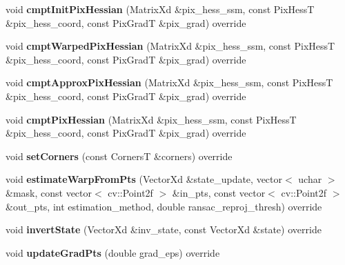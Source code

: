\begin{DoxyCompactItemize}
\item 
\hypertarget{classTPS_a16d1b72bf97b423d5d760c1ec2b727d3}{void {\bfseries cmpt\-Init\-Pix\-Hessian} (Matrix\-Xd \&pix\-\_\-hess\-\_\-ssm, const Pix\-Hess\-T \&pix\-\_\-hess\-\_\-coord, const Pix\-Grad\-T \&pix\-\_\-grad) override}\label{classTPS_a16d1b72bf97b423d5d760c1ec2b727d3}

\item 
\hypertarget{classTPS_ac5d977af551d1eb7a14006811ced666a}{void {\bfseries cmpt\-Warped\-Pix\-Hessian} (Matrix\-Xd \&pix\-\_\-hess\-\_\-ssm, const Pix\-Hess\-T \&pix\-\_\-hess\-\_\-coord, const Pix\-Grad\-T \&pix\-\_\-grad) override}\label{classTPS_ac5d977af551d1eb7a14006811ced666a}

\item 
\hypertarget{classTPS_ad5c53e500b568cedc1ebc722df1bac32}{void {\bfseries cmpt\-Approx\-Pix\-Hessian} (Matrix\-Xd \&pix\-\_\-hess\-\_\-ssm, const Pix\-Hess\-T \&pix\-\_\-hess\-\_\-coord, const Pix\-Grad\-T \&pix\-\_\-grad) override}\label{classTPS_ad5c53e500b568cedc1ebc722df1bac32}

\item 
\hypertarget{classTPS_a2fc02df63da4f564f8dbcaa924af1fa8}{void {\bfseries cmpt\-Pix\-Hessian} (Matrix\-Xd \&pix\-\_\-hess\-\_\-ssm, const Pix\-Hess\-T \&pix\-\_\-hess\-\_\-coord, const Pix\-Grad\-T \&pix\-\_\-grad) override}\label{classTPS_a2fc02df63da4f564f8dbcaa924af1fa8}

\item 
\hypertarget{classTPS_a0c6679a35c6bea32a13ea5567afa1e74}{void {\bfseries set\-Corners} (const Corners\-T \&corners) override}\label{classTPS_a0c6679a35c6bea32a13ea5567afa1e74}

\item 
\hypertarget{classTPS_aa02fee8fd22007176bd608f4f244dddf}{void {\bfseries estimate\-Warp\-From\-Pts} (Vector\-Xd \&state\-\_\-update, vector$<$ uchar $>$ \&mask, const vector$<$ cv\-::\-Point2f $>$ \&in\-\_\-pts, const vector$<$ cv\-::\-Point2f $>$ \&out\-\_\-pts, int estimation\-\_\-method, double ransac\-\_\-reproj\-\_\-thresh) override}\label{classTPS_aa02fee8fd22007176bd608f4f244dddf}

\item 
\hypertarget{classTPS_ada58c5320efe459e7a500a6f62bad47f}{void {\bfseries invert\-State} (Vector\-Xd \&inv\-\_\-state, const Vector\-Xd \&state) override}\label{classTPS_ada58c5320efe459e7a500a6f62bad47f}

\item 
\hypertarget{classTPS_abc8c5e4409991cb99972aae39ffcb2ea}{void {\bfseries update\-Grad\-Pts} (double grad\-\_\-eps) override}\label{classTPS_abc8c5e4409991cb99972aae39ffcb2ea}


\end{DoxyCompactItemize}
